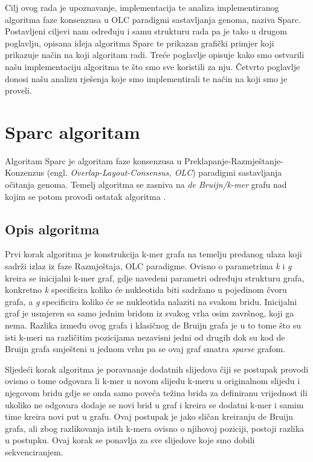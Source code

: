 \documentclass[times, utf8, seminar, numeric]{fer}
\begin{document}
Cilj ovog rada je upoznavanje, implementacija te analiza implementiranog algoritma faze konsenzusa u OLC paradigmi sastavljanja genoma, naziva Sparc. Postavljeni ciljevi nam određuju i samu strukturu rada pa je tako u drugom poglavlju, opisana ideja algoritma Sparc te prikazan grafički primjer koji prikazuje način na koji algoritam radi. Treće poglavlje opisuje kako smo ostvarili našu implementaciju algoritma te što smo sve koristili za nju. Četvrto poglavlje donosi našu analizu rješenja koje smo implementirali te način na koji smo je proveli.


\chapter{Sparc algoritam}
Algoritam Sparc je algoritam faze konsenzusa u Preklapanje-Razmještanje-Konzenzus (engl. \emph{Overlap-Layout-Consensus, OLC}) paradigmi sastavljanja očitanja genoma. Temelj algoritma se zasniva na \emph{de Bruijn/k-mer} grafu nad kojim se potom provodi ostatak algoritma \cite{Ye2016}.
\section{Opis algoritma}
Prvi korak algoritma je konstrukcija k-mer grafa na temelju predanog ulaza koji sadrži izlaz iz faze Razmještaja, OLC paradigme. Ovisno o parametrima \emph{k} i \emph{g} kreira se inicijalni k-mer graf, gdje navedeni parametri određuju strukturu grafa, konkretno \emph{k} specificira koliko će nukleotida biti sadržano u pojedinom čvoru grafa, a \emph{g} specificira koliko će se nukleotida nalaziti na svakom bridu. Inicijalni graf je usmjeren sa samo jednim bridom iz svakog vrha osim završnog, koji ga nema. Razlika između ovog grafa i klasičnog de Bruijn grafa je u to tome što su isti k-meri na različitim pozicijama nezavisni jedni od drugih dok su kod de Bruijn grafa smješteni u jednom vrhu pa se ovaj graf smatra \emph {sparse} grafom. 

Sljedeći korak algoritma je poravnanje dodatnih slijedova čiji se postupak provodi ovisno o tome odgovara li k-mer u novom slijedu k-meru u originalnom slijedu i njegovom bridu gdje se onda samo poveća težina brida za definiranu vrijednost ili ukoliko ne odgovara dodaje se novi brid u graf i kreira se dodatni k-mer i samim time kreira novi put u grafu. Ovaj postupak je jako sličan kreiranju de Bruijn grafa, ali zbog razlikovanja istih k-mera ovisno o njihovoj poziciji, postoji razlika u postupku. Ovaj korak se ponavlja za sve slijedove koje smo dobili sekvenciranjem. 
\end{document}

